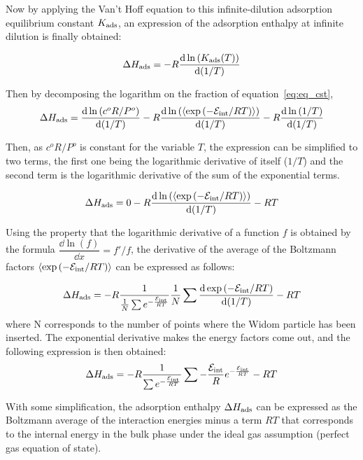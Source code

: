 \documentclass[main.tex]{subfiles}
\begin{document}
Now by applying the Van't Hoff equation to this infinite-dilution adsorption equilibrium constant $K_{\text{ads}}$, an expression of the adsorption enthalpy at infinite dilution is finally obtained:

\begin{equation}
  \Delta H_{\text{ads}} = -R\dfrac{\mathop{}\mathopen{}\mathrm{d} \ln\left(K_{\text{ads}}(T)\right)}{\mathop{}\mathopen{}\mathrm{d} (1/T)}
\end{equation}

Then by decomposing the logarithm on the fraction of equation~\ref{eq:eq_cst}, 
\begin{equation}
  \Delta H_{\text{ads}} = \dfrac{\mathop{}\mathopen{}\mathrm{d} \ln\left(c^o R/P^o\right)}{\mathop{}\mathopen{}\mathrm{d} (1/T)} - R\dfrac{\mathop{}\mathopen{}\mathrm{d} \ln\left(\langle \exp\left(-\mathcal{E}_{\text{int}}/RT\right) \rangle\right)}{\mathop{}\mathopen{}\mathrm{d} (1/T)} - R\dfrac{\mathop{}\mathopen{}\mathrm{d} \ln\left(1/T\right)}{\mathop{}\mathopen{}\mathrm{d} (1/T)}
\end{equation}

Then, as $c^o R/P^o$ is constant for the variable $T$, the expression can be simplified to two terms, the first one being the logarithmic derivative of itself ($1/T$) and the second term is the logarithmic derivative of the sum of the exponential terms. 

\begin{equation}
  \Delta H_{\text{ads}} = 0 - R\dfrac{\mathop{}\mathopen{}\mathrm{d} \ln\left(\langle \exp\left(-\mathcal{E}_{\text{int}}/RT\right) \rangle\right)}{\mathop{}\mathopen{}\mathrm{d} (1/T)} - RT
\end{equation}

Using the property that the logarithmic derivative of a function $f$ is obtained by the formula $\dfrac{\dd \ln\left(f\right)}{\dd x}=f'/f$, the derivative of the average of the Boltzmann factors $\langle \exp\left(-\mathcal{E}_{\text{int}}/RT\right) \rangle$ can be expressed as follows:

\begin{equation}
  \Delta H_{\text{ads}} = -R\dfrac{1}{\frac{1}{N}\sum e^{-\frac{\mathcal{E}_{\text{int}}}{RT}}} \frac{1}{N}\sum \dfrac{\mathop{}\mathopen{}\mathrm{d} \exp\left(-\mathcal{E}_{\text{int}}/RT\right)}{\mathop{}\mathopen{}\mathrm{d} (1/T)} - RT
\end{equation}
where N corresponds to the number of points where the Widom particle has been inserted.
The exponential derivative makes the energy factors come out, and the following expression is then obtained:
\begin{equation}
  \Delta H_{\text{ads}} = -R\dfrac{1}{\sum e^{-\frac{\mathcal{E}_{\text{int}}}{RT}}} \sum - \frac{\mathcal{E}_{\text{int}}}{R} e^{-\frac{\mathcal{E}_{\text{int}}}{RT}} - RT
\end{equation}

With some simplification, the adsorption enthalpy $\Delta H_{\text{ads}}$ can be expressed as the Boltzmann average of the interaction energies minus a term $RT$ that corresponds to the internal energy in the bulk phase under the ideal gas assumption (perfect gas equation of state).
\end{document}

